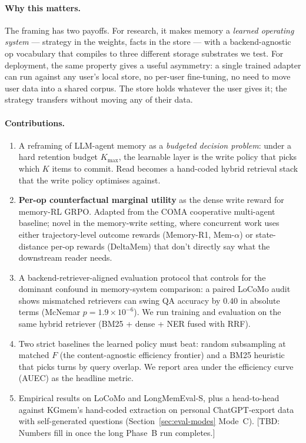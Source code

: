 \documentclass[11pt]{article}
\newcommand{\TBD}[1]{%
  \textcolor{red!80!black}{\textsf{[TBD: #1]}}}
\begin{document}
\paragraph{Why this matters.} The framing has two payoffs. For
research, it makes memory a \emph{learned operating system} ---
strategy in the weights, facts in the store --- with a backend-agnostic
op vocabulary that compiles to three different storage substrates we
test. For deployment, the same property gives a useful asymmetry: a
single trained adapter can run against any user's local store, no
per-user fine-tuning, no need to move user data into a shared corpus.
The store holds whatever the user gives it; the strategy transfers
without moving any of their data.

\paragraph{Contributions.}
\begin{enumerate}
  \item A reframing of LLM-agent memory as a \emph{budgeted decision
    problem}: under a hard retention budget $K_{\max}$, the learnable
    layer is the write policy that picks which $K$ items to commit.
    Read becomes a hand-coded hybrid retrieval stack that the write
    policy optimises against.
  \item \textbf{Per-op counterfactual marginal utility} as the dense
    write reward for memory-RL GRPO. Adapted from the COMA cooperative
    multi-agent baseline; novel in the memory-write setting, where
    concurrent work uses either trajectory-level outcome rewards
    (Memory-R1, Mem-$\alpha$) or state-distance per-op rewards
    (DeltaMem) that don't directly say what the downstream reader
    needs.
  \item A backend-retriever-aligned evaluation protocol that controls
    for the dominant confound in memory-system comparison: a paired
    LoCoMo audit shows mismatched retrievers can swing QA accuracy by
    $0.40$ in absolute terms (McNemar $p = 1.9\!\times\!10^{-6}$). We
    run training and evaluation on the same hybrid retriever (BM25 +
    dense + NER fused with RRF).
  \item Two strict baselines the learned policy must beat: random
    subsampling at matched $F$ (the content-agnostic efficiency
    frontier) and a BM25 heuristic that picks turns by query overlap.
    We report area under the efficiency curve (AUEC) as the headline
    metric.
  \item Empirical results on LoCoMo and LongMemEval-S, plus a
    head-to-head against KGmem's hand-coded extraction on personal
    ChatGPT-export data with self-generated questions
    (Section~\ref{sec:eval-modes} Mode~C). \TBD{Numbers fill in once
    the long Phase~B run completes.}
\end{enumerate}
\end{document}
